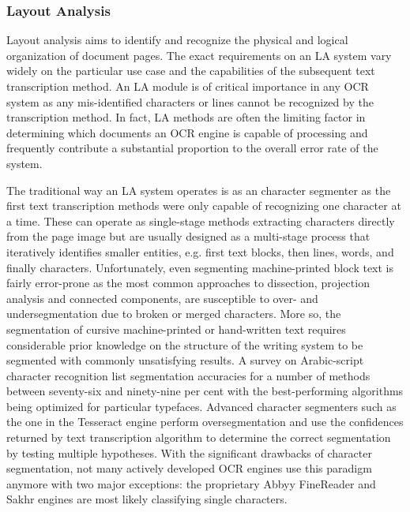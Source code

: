 \subsubsection{Layout Analysis}
\label{s:la}

Layout analysis aims to identify and recognize the physical and logical
organization of document pages. The exact requirements on an LA system vary
widely on the particular use case and the capabilities of the subsequent text
transcription method. An LA module is of critical importance in any OCR system
as any mis-identified characters or lines cannot be recognized by the
transcription method. In fact, LA methods are often the limiting factor in
determining which documents an OCR engine is capable of processing and
frequently contribute a substantial proportion to the overall error rate of the
system.

The traditional way an LA system operates is as an character segmenter as the
first text transcription methods were only capable of recognizing one character
at a time. These can operate as single-stage methods extracting characters
directly from the page image but are usually designed as a multi-stage process
that iteratively identifies smaller entities, e.g. first text blocks, then
lines, words, and finally characters. Unfortunately, even segmenting machine-printed
block text is fairly error-prone as the most common approaches to dissection,
projection analysis and connected components, are susceptible to over- and
undersegmentation due to broken or merged characters\cite[sec.
2]{casey1996survey}. More so, the segmentation of cursive machine-printed or
hand-written text requires considerable prior knowledge on the structure of the
writing system to be segmented with commonly unsatisfying results. A survey on
Arabic-script character recognition \cite{alginahi2013survey} list segmentation
accuracies for a number of methods between seventy-six and ninety-nine per cent
with the best-performing algorithms being optimized for particular typefaces.
Advanced character segmenters such as the one in the Tesseract engine
\cite{smith2007overview} perform oversegmentation and use the confidences
returned by text transcription algorithm to determine the correct segmentation
by testing multiple hypotheses. With the significant drawbacks of character
segmentation, not many actively developed OCR engines use this paradigm anymore
with two major exceptions: the proprietary Abbyy FineReader and Sakhr engines
are most likely classifying single characters.

